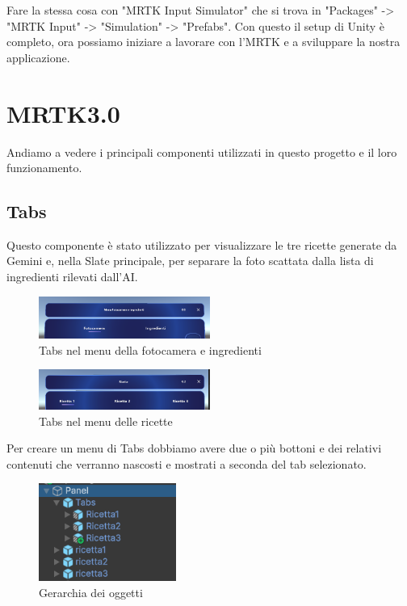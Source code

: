 Fare la stessa cosa con "MRTK Input Simulator" che si trova in "Packages" -> "MRTK Input" -> "Simulation" -> "Prefabs".
Con questo il setup di Unity è completo, ora possiamo iniziare a lavorare con l'MRTK e a sviluppare la nostra applicazione.
\section{MRTK3.0}
Andiamo a vedere i principali componenti utilizzati in questo progetto e il loro funzionamento.
\subsection{Tabs}
Questo componente è stato utilizzato per visualizzare le tre ricette generate da Gemini e, nella Slate principale, per separare la foto scattata dalla lista di ingredienti rilevati dall'AI.

\begin{figure}[H]
    \centering
    \includegraphics[width=0.5\textwidth,height=\textheight,keepaspectratio]{figures/chapter_1/tabs1.png}
    \caption{Tabs nel menu della fotocamera e ingredienti}
\end{figure}

\begin{figure}[H]
    \centering
    \includegraphics[width=0.5\textwidth,height=\textheight,keepaspectratio]{figures/chapter_1/tabs2.png}
    \caption{Tabs nel menu delle ricette}
\end{figure}
Per creare un menu di Tabs dobbiamo avere due o più bottoni e dei relativi contenuti che verranno nascosti e mostrati a seconda del tab selezionato.
\begin{figure}[H]
    \centering
    \includegraphics[width=0.4\textwidth,height=\textheight,keepaspectratio]{figures/chapter_1/tabs-gerarchia.png}
    \caption{Gerarchia dei oggetti}
\end{figure}

